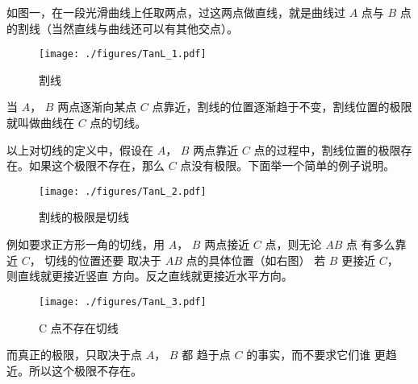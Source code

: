 
\begin{issues}
\issueTODO
\end{issues}


如图一，在一段光滑曲线上任取两点，过这两点做直线，就是曲线过 $A$ 点与 $B$ 点的割线（当然直线与曲线还可以有其他交点）。
\begin{figure}[ht]
\centering
\texttt{[image: ./figures/TanL\_1.pdf]}
\caption{割线} \label{TanL_fig1}
\end{figure}
当 $A$，  $B$ 两点逐渐向某点 $C$ 点靠近，割线的位置逐渐趋于不变，割线位置的极限就叫做曲线在 $C$ 点的切线。

以上对切线的定义中，假设在 $A$，  $B$ 两点靠近 $C$ 点的过程中，割线位置的极限存在。如果这个极限不存在，那么 $C$ 点没有极限。下面举一个简单的例子说明。

\begin{figure}[ht]
\vskip 0pt
\centering
\texttt{[image: ./figures/TanL\_2.pdf]}
\caption{割线的极限是切线} \label{TanL_fig2}
\end{figure}
例如要求正方形一角的切线，用
 $A$，  $B$ 两点接近 $C$ 点，则无论 $AB$ 点
有多么靠近 $C$， 切线的位置还要
取决于 $AB$ 点的具体位置（如右图）
若 $B$ 更接近 $C$， 则直线就更接近竖直
方向。反之直线就更接近水平方向。

\begin{figure}[ht]
\centering
\texttt{[image: ./figures/TanL\_3.pdf]}
\caption{C 点不存在切线} \label{TanL_fig3}
\end{figure}

而真正的极限，只取决于点 $A$，  $B$ 都
趋于点 $C$ 的事实，而不要求它们谁
更趋近。所以这个极限不存在。
